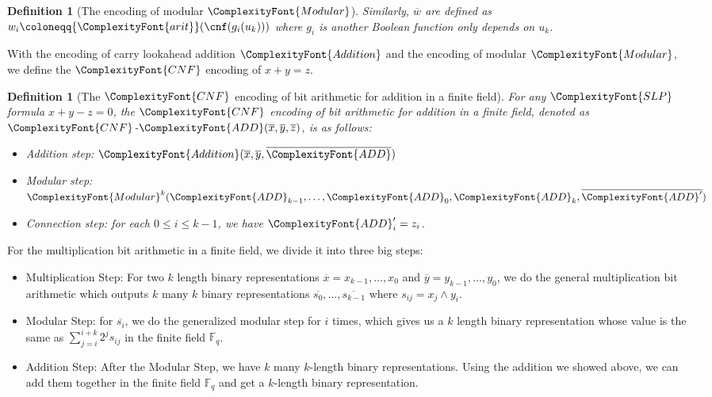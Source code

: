 \documentclass[11pt,letter]{article}
\newtheorem{definition}[theorem]{Definition}
\theoremstyle{remark} %
\newcommand{\CNF}{ %
    {
        \ComplexityFont{CNF}
    }
}
\newcommand{\arit}{ %
    {
        \ComplexityFont{arit}
    }
}
\newcommand{\add}{ %
    {
        \ComplexityFont{ADD}
    }
}
\newcommand{\addition}{ %
    {
        \ComplexityFont{Addition}
    }
}
\newcommand{\modular}{ %
    {
        \ComplexityFont{Modular}
    }
}
\newcommand{\SLP}{ %
    {
        \ComplexityFont{SLP}
    }
}
\begin{document}
{\begin{definition}[The encoding of modular $\modular$]
        Similarly, $\overline{w}$ are defined as $w_i \coloneqq \arit(\cnf(g_i(u_k)))$ where $g_i$ is another Boolean function only depends on $u_k$.
    \end{definition}

    With the encoding of carry lookahead addition $\addition$ and the encoding of modular $\modular$, we define the $\CNF$ encoding of $x+y=z$.
    \begin{definition}[The $\CNF$ encoding of bit arithmetic for addition in a finite field]
        \label{def: cnf addition}
        For any $\SLP$ formula $x+y-z=0$, the $\CNF$ encoding of bit arithmetic for addition in a finite field, denoted as $\CNF$-$\add(\overline{x},\overline{y},\overline{z})$, is as follows:
        \begin{itemize}
            \item Addition step: $\addition(\overline{x},\overline{y}, \overline{\add})$
            \item Modular step: $\modular^{k}(\add_{k-1}, \dots, \add_0, \add_k, \overline{\add^\prime})$
            \item Connection step: for each $0 \leq i \leq k-1$, we have $\add_i^\prime = z_i$.
        \end{itemize}
    \end{definition}
    \bigskip

    
    For the multiplication bit arithmetic in a finite field, we divide it into three big steps:
    \begin{itemize}
        \item Multiplication Step: For two $k$ length binary representations $\overline{x}= x_{k-1}, \dots, x_0$ and $\overline{y}=y_{k-1},\dots,y_0$, we do the general multiplication bit arithmetic which outputs $k$ many $k$ binary representations $\overline{s_0}, \dots, \overline{s_{k-1}}$ where $s_{ij}=x_j \land y_i$.
        \item Modular Step: for $\overline{s_i}$, we do the generalized modular step for $i$ times, which gives us a $k$ length binary representation whose value is the same as $\sum_{j=i}^{i+k} 2^j s_{ij}$ in the finite field $\mathbb{F}_q$.
        \item Addition Step: After the Modular Step, we have $k$ many $ k$-length binary representations. Using the addition we showed above, we can add them together in the finite field $\mathbb{F}_q$ and get a $k$-length binary representation.
    \end{itemize}
    
}
\end{document}
